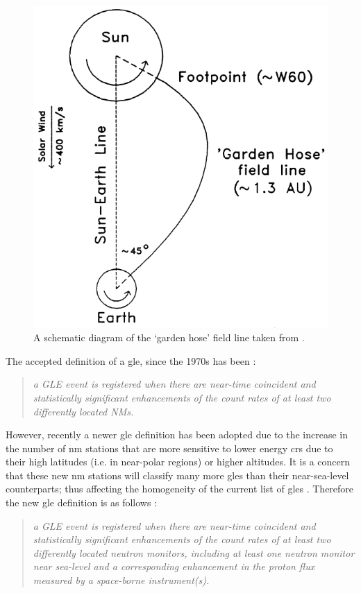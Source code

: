 \begin{figure}[ht!]
	\centering
	\includegraphics[width=0.75\columnwidth]{garden_hose.png}
	\caption{A schematic diagram of the `garden hose' field line taken from \cite{duldig_ground_1993}.}
	\label{fig:garden_hose}
\end{figure}

The accepted definition of a \gls{gle}, since the 1970s has been \citep{poluianov_gle_2017}: 

\begin{quote}
	\textit{a GLE event is registered when there are near-time coincident and statistically significant enhancements of the count rates of at least two differently located NMs.}
\end{quote}

However, recently a newer \gls{gle} definition has been adopted due to the increase in the number of \gls{nm} stations that are more sensitive to lower energy \glspl{cr} due to their high latitudes (i.e. in near-polar regions) or higher altitudes. It is a concern that these new \gls{nm} stations will classify many more \glspl{gle} than their near-sea-level counterparts; thus affecting the homogeneity of the current list of \glspl{gle} \citep{poluianov_gle_2017}. Therefore the new \gls{gle} definition is as follows \citep{poluianov_gle_2017}: 

\begin{quote}
	\textit{a GLE event is registered when there are near-time coincident and statistically significant enhancements of the count rates of at least two differently located neutron monitors, including at least one neutron monitor near sea-level and a corresponding enhancement in the proton flux measured by a space-borne instrument(s).}
\end{quote}

